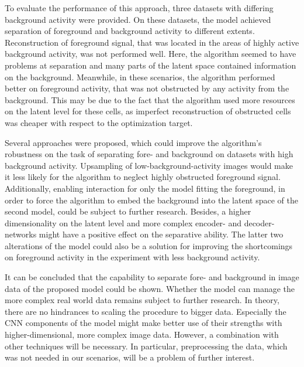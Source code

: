 \documentclass[12pt]{report}
\theoremstyle{definition}
\begin{document}
To evaluate the performance of this approach, three datasets with differing background activity were provided. On these datasets, the model achieved separation of foreground and background activity to different extents. Reconstruction of foreground signal, that was located in the areas of highly active background activity, was not performed well. Here, the algorithm seemed to have problems at separation and many parts of the latent space contained information on the background. Meanwhile, in these scenarios, the algorithm performed better on foreground activity, that was not obstructed by any activity from the background. This may be due to the fact that the algorithm used more resources on the latent level for these cells, as imperfect reconstruction of obstructed cells was cheaper with respect to the optimization target. 

Several approaches were proposed, which could improve the algorithm's robustness on the task of separating fore- and background on datasets with high background activity. Upsampling of low-background-activity images would make it less likely for the algorithm to neglect highly obstructed foreground signal. Additionally, enabling interaction for only the model fitting the foreground, in order to force the algorithm to embed the background into the latent space of the second model, could be subject to further research. Besides, a higher dimensionality on the latent level and more complex encoder- and decoder-networks might have a positive effect on the separative ability. The latter two alterations of the model could also be a solution for improving the shortcomings on foreground activity in the experiment with less background activity.

It can be concluded that the capability to separate fore- and background in image data of the proposed model could be shown. Whether the model can manage the more complex real world data remains subject to further research. In theory, there are no hindrances to scaling the procedure to bigger data. Especially the CNN components of the model might make better use of their strengths with higher-dimensional, more complex image data. However, a combination with other techniques will be necessary. In particular, preprocessing the data, which was not needed in our scenarios, will be a problem of further interest.

\medskip
\end{document}

